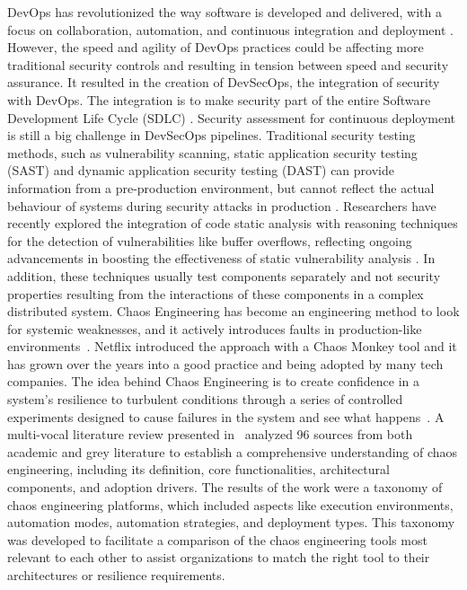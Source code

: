 \documentclass[pdflatex,sn-mathphys-num]{sn-jnl}%
\theoremstyle{thmstyleone}%
\theoremstyle{thmstyletwo}%
\theoremstyle{thmstylethree}%
\begin{document}
	DevOps has revolutionized the way software is developed and delivered, with a focus on collaboration, automation, and continuous integration and deployment \cite{myrbakken2020security}. However, the speed and agility of DevOps practices could be affecting more traditional security controls and resulting in tension between speed and security assurance. It resulted in the creation of DevSecOps, the integration of security with DevOps. The integration is to make security part of the entire Software Development Life Cycle (SDLC) \cite{myrbakken2020security}. Security assessment for continuous deployment is still a big challenge in DevSecOps pipelines. Traditional security testing methods, such as vulnerability scanning, static application security testing (SAST) and dynamic application security testing (DAST) can provide information from a pre-production environment, but cannot reflect the actual behaviour of systems during security attacks in production \cite{myrbakken2021security}. Researchers have recently explored the integration of code static analysis with reasoning techniques for the detection of vulnerabilities like buffer overflows, reflecting ongoing advancements in boosting the effectiveness of static vulnerability analysis \cite{huang2026cotstatic}. In addition, these techniques usually test components separately and not security properties resulting from the interactions of these components in a complex distributed system.
	Chaos Engineering has become an engineering method to look for systemic weaknesses, and it actively introduces faults in production-like environments~\cite{basiri2016chaos}. Netflix introduced the approach with a Chaos Monkey tool and it has grown over the years into a good practice and being adopted by many tech companies. The idea behind Chaos Engineering is to create confidence in a system's resilience to turbulent conditions through a series of controlled experiments designed to cause failures in the system and see what happens~\cite{basiri2016chaos}.	A multi-vocal literature review presented in~\cite{owotogbe2025chaos} analyzed 96 sources from both academic and grey literature to establish a comprehensive understanding of chaos engineering, including its definition, core functionalities, architectural components, and adoption drivers. The results of the work were a taxonomy of chaos engineering platforms, which included aspects like execution environments, automation modes, automation strategies, and deployment types. This taxonomy was developed to facilitate a comparison of the chaos engineering tools most relevant to each other to assist organizations to match the right tool to their architectures or resilience requirements. 	
	
\end{document}
